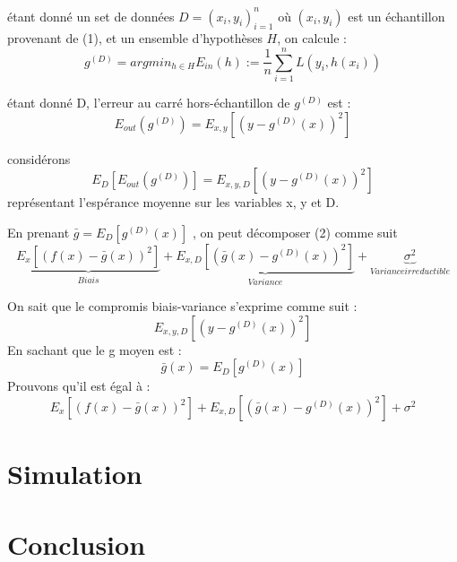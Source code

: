 \documentclass[a4paper]{article}
\begin{document}
étant donné un set de données $D = {(x_i, y_i)}^n_{i=1}$ où $(x_i, y_i)$ est un échantillon provenant de (1), et un ensemble d'hypothèses $H$, on calcule : \newline
\[ g^{(D)} = argmin_{h\in H}  E_{in}(h) := \frac{1}{n} \sum_{i=1}^{n} L(y_i,h(x_i)) \]

étant donné D, l'erreur au carré hors-échantillon de $g^{(D)}$ est : \newline
\[ E_{out}(g^{(D)}) = E_{x,y}[(y - g^{(D)}(x))^2] \]

considérons 
\begin{equation}
E_D[E_{out}(g^{(D)})] = E_{x,y,D}[(y - g^{(D)}(x))^2]
\end{equation}
représentant l'espérance moyenne sur les variables x, y et D. \newline

En prenant $ \bar{g} = E_D[g^{(D)}(x)]$ , on peut décomposer (2) comme suit 
\[ \underbrace{E_x[(f(x) - \bar{g}(x))^2]}_{Biais} + \underbrace{E_{x,D}[(\bar{g}(x) - g^{(D)}(x))^2]}_{Variance} + \underbrace{\sigma^2}_{Variance irreductible} \]

\newpage

On sait que le compromis biais-variance s'exprime comme suit : 
\[ E_{x,y,D}[(y-g^{(D)}(x))^2] \]
En sachant que le g moyen est :
\begin{equation}
\label{g_moyen}
\bar{g}(x) = E_D [g^{(D)}(x)]
\end{equation}
Prouvons qu'il est égal à :
\[ E_x[(f(x) - \bar{g}(x))^2] + E_{x,D}[(\bar{g}(x) - g^{(D)}(x))^2] + \sigma^2 \]

\section{Simulation}
 
\newpage

\section{Conclusion}

\newpage
\end{document}
